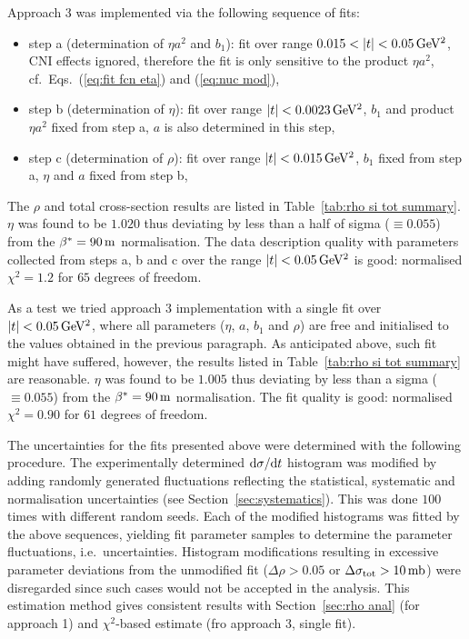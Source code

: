 Approach 3 was implemented via the following sequence of fits:
\begin{itemize}
\item step a (determination of $\eta a^2$ and $b_1$): fit over range $0.015 < |t| < 0.05\,{\rm GeV^2}$, CNI effects ignored, therefore the fit is only sensitive to the product $\eta a^2$, cf.~Eqs.~(\ref{eq:fit fcn eta}) and (\ref{eq:nuc mod}),
\item step b (determination of $\eta$): fit over range $|t| < 0.0023\,{\rm GeV^2}$, $b_1$ and product $\eta a^2$ fixed from step a, $a$ is also determined in this step,
\item step c (determination of $\rho$): fit over range $|t| < 0.015\,{\rm GeV^2}$, $b_1$ fixed from step a, $\eta$ and $a$ fixed from step b,
\end{itemize}
The $\rho$ and total cross-section results are listed in Table~\ref{tab:rho si tot summary}. $\eta$ was found to be $1.020$ thus deviating by less than a half of sigma ($\equiv 0.055$) from the $\beta^* = 90\,{\rm m}$ normalisation. The data description quality with parameters collected from steps a, b and c over the range $|t| < 0.05\,{\rm GeV^2}$ is good: normalised $\chi^2 = 1.2$ for $65$ degrees of freedom.

As a test we tried approach 3 implementation with a single fit over $|t| < 0.05\,{\rm GeV^2}$, where all parameters ($\eta$, $a$, $b_1$ and $\rho$) are free and initialised to the values obtained in the previous paragraph. As anticipated above, such fit might have suffered, however, the results listed in Table~\ref{tab:rho si tot summary} are reasonable. $\eta$ was found to be $1.005$ thus deviating by less than a sigma ($\equiv 0.055$) from the $\beta^* = 90\,{\rm m}$ normalisation. The fit quality is good: normalised $\chi^2 = 0.90$ for $61$ degrees of freedom.

The uncertainties for the fits presented above were determined with the following procedure. The experimentally determined ${\rm d}\sigma/{\rm d} t$ histogram was modified by adding randomly generated fluctuations reflecting the statistical, systematic and normalisation uncertainties (see Section~\ref{sec:systematics}). This was done $100$ times with different random seeds. Each of the modified histograms was fitted by the above sequences, yielding fit parameter samples to determine the parameter fluctuations, i.e.~uncertainties. Histogram modifications resulting in excessive parameter deviations from the unmodified fit ($\Delta\rho > 0.05$ or $\Delta\sigma_{\rm tot} > 10\,{\rm mb}$) were disregarded since such cases would not be accepted in the analysis. This estimation method gives consistent results with Section~\ref{sec:rho anal} (for approach 1) and $\chi^2$-based estimate (fro approach 3, single fit).

